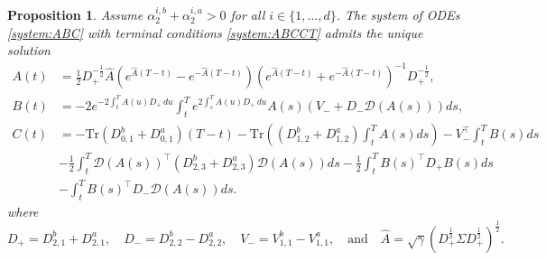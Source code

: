 \documentclass[preprint, 3p]{elsarticle}
\newcommand{\1}{{\chi}}
\newtheorem{proposition}{Proposition}
\begin{document}
\begin{proposition}\label{prop:ode_solution}
Assume $\alpha^{i, b}_2 + \alpha^{i, a}_2 > 0$ for all $i \in \{ 1, \ldots, d
\}$. The system of ODEs \eqref{system:ABC} with terminal conditions
\eqref{system:ABCCT} admits the unique solution
\begin{align}
A(t) & = \frac{1}{2} D^{-\frac 12}_+ \widehat{A}
    \left( e^{ \widehat{A} (T - t)} - e^{-\widehat{A} (T - t)} \right)
    \left( e^{ \widehat{A} (T - t)} + e^{-\widehat{A} (T - t)} \right)^{-1} D_+^{-\frac 12},
         \label{eq:solA} \\
B(t) & = -2 e^{-2 \int_t^T A(u) D_+ \,du} \int_t^T
            e^{ 2 \int_s^T A(u) D_+ \,du} A(s)
            \left( V_- + D_- \mathcal D(A(s)) \right) ds,
            \label{eq:solB} \\
C(t) & = -\textrm{Tr}\left(D^b_{0,1} + D^a_{0,1}\right) (T - t)
       -  \textrm{Tr}\left(\left(D^b_{1,2} + D^a_{1,2}\right) \int_t^T A(s) ds \right)
       -  V_-^\intercal  \int_t^T B(s) ds \nonumber \\
     & - \frac 12 \int_t^T \mathcal{D}(A(s))^\intercal \left(D^b_{2,3}
         + D^a_{2,3}\right) \mathcal{D}(A(s)) ds
       - \frac 12 \int_t^T B(s)^\intercal D_+ B(s) ds  \nonumber \\
     & - \int_t^T B(s)^\intercal D_- \mathcal{D}(A(s)) ds.\label{eq:solC}
\end{align}
where
\[ D_+ = D^b_{2,1} + D^a_{2,1}, \quad
   D_- = D_{2,2}^b - D_{2,2}^a, \quad
   V_- = V_{1,1}^b - V_{1,1}^a, \quad \text{and} \quad
   \widehat{A}
   = \sqrt{\gamma} \left( D_+^{\frac 12} \Sigma D_+^{\frac 12} \right)^{\frac 12}. \]
\end{proposition}
\end{document}
